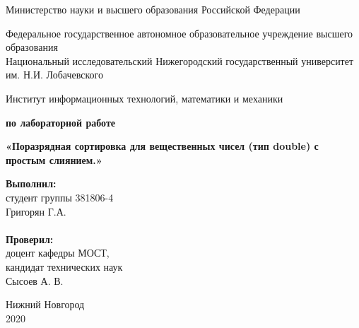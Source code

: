\documentclass{report}
\begin{document}
\begin{titlepage}

\begin{center}
Министерство науки и высшего образования Российской Федерации
\end{center}

\begin{center}
Федеральное государственное автономное образовательное учреждение высшего образования \\
Национальный исследовательский Нижегородский государственный университет им. Н.И. Лобачевского
\end{center}

\begin{center}
Институт информационных технологий, математики и механики
\end{center}

\vspace{4em}

\begin{center}
\textbf{ по лабораторной работе} \\
\end{center}
\begin{center}
\textbf{\Large«Поразрядная сортировка для вещественных чисел 
(тип double) с простым слиянием.»} \\
\end{center}

\vspace{4em}

\newbox{\lbox}
\newlength{\maxl}
\setlength{\maxl}{\wd\lbox}
\hfill\parbox{7cm}{
\hspace*{5cm}\hspace*{-5cm}\textbf{Выполнил:} \\ студент группы 381806-4 \\ Григорян Г.А.\\
\\
\hspace*{5cm}\hspace*{-5cm}\textbf{Проверил:}\\ доцент кафедры МОСТ, \\ кандидат технических наук \\ Сысоев А. В. \\
}
\vspace{\fill}

\begin{center} Нижний Новгород \\ 2020 \end{center}

\end{titlepage}
\end{document}
